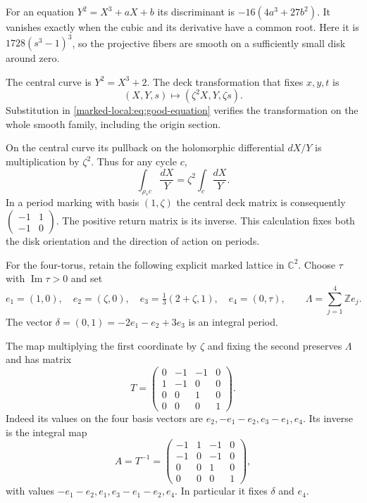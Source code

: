 For an equation $Y^2=X^3+aX+b$ its discriminant is
$-16(4a^3+27b^2)$. It vanishes exactly when the cubic and its
derivative have a common root. Here it is
$1728(s^3-1)^3$, so the projective fibers are smooth on a
sufficiently small disk around zero.

The central curve is
$Y^2=X^3+2$. The deck transformation that fixes $x,y,t$ is
\begin{equation}\label{marked-local:eq:actual-elliptic-deck}
 (X,Y,s)\longmapsto(\zeta^2X,Y,\zeta s).
\end{equation}
Substitution in \eqref{marked-local:eq:good-equation} verifies the transformation
on the whole smooth family, including the origin section.

On the central curve its pullback on the holomorphic differential
$dX/Y$ is multiplication by $\zeta^2$. Thus for any cycle $c$,
\[
 \int_{\rho_*c}\frac{dX}{Y}=\zeta^2\int_c\frac{dX}{Y}.
\]
In a period marking with basis $(1,\zeta)$ the central deck matrix
is consequently
$\left(\begin{smallmatrix}-1&1\\-1&0\end{smallmatrix}\right)$.
The positive return matrix is its inverse. This calculation fixes
both the disk orientation and the direction of action on periods.

For the four-torus, retain the following explicit marked lattice
in $\mathbb C^2$. Choose $\tau$ with $\operatorname{Im}\tau>0$ and set
\begin{equation}\label{marked-local:eq:period-lattice}
 e_1=(1,0),\quad e_2=(\zeta,0),\quad
 e_3=\tfrac13(2+\zeta,1),\quad e_4=(0,\tau),
 \qquad \Lambda=\sum_{j=1}^4\mathbb Ze_j.
\end{equation}
The vector $\delta=(0,1)=-2e_1-e_2+3e_3$ is an integral
period.

The map multiplying the first coordinate by $\zeta$ and
fixing the second preserves $\Lambda$ and has matrix
\begin{equation}\label{marked-local:eq:positive-T}
 T=\begin{pmatrix}0&-1&-1&0\\1&-1&0&0\\0&0&1&0\\0&0&0&1\end{pmatrix}.
\end{equation}
Indeed its values on the four basis vectors are
$e_2,-e_1-e_2,e_3-e_1,e_4$. Its inverse is the integral map
\begin{equation}\label{marked-local:eq:inverse-T}
 A=T^{-1}=
 \begin{pmatrix}-1&1&-1&0\\-1&0&-1&0\\0&0&1&0\\0&0&0&1\end{pmatrix},
\end{equation}
with values $-e_1-e_2,e_1,e_3-e_1-e_2,e_4$.
In particular it fixes $\delta$ and $e_4$.

